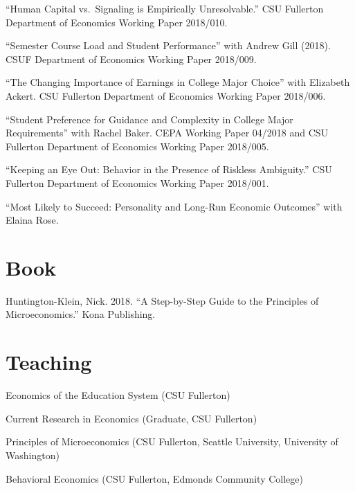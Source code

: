 \documentclass[11pt,a4paper,serif]{moderncv}
\begin{document}
 \begin{hangparas}{.25in}{1} 
 ``Human Capital vs.~Signaling is Empirically Unresolvable.'' CSU Fullerton Department of Economics Working Paper 2018/010.



``Semester Course Load and Student Performance'' with Andrew Gill (2018). CSUF Department of Economics Working Paper 2018/009.



``The Changing Importance of Earnings in College Major Choice'' with Elizabeth Ackert. CSU Fullerton Department of Economics Working Paper 2018/006.



``Student Preference for Guidance and Complexity in College Major Requirements'' with Rachel Baker. CEPA Working Paper 04/2018 and CSU Fullerton Department of Economics Working Paper 2018/005.



``Keeping an Eye Out: Behavior in the Presence of Riskless Ambiguity.'' CSU Fullerton Department of Economics Working Paper 2018/001.



``Most Likely to Succeed: Personality and Long-Run Economic Outcomes'' with Elaina Rose.

 
 \end{hangparas}


\section{Book}  
  
Huntington-Klein, Nick. 2018. ``A Step-by-Step Guide to the Principles of Microeconomics.'' Kona Publishing.



\section{Teaching}  
  
Economics of the Education System (CSU Fullerton)



Current Research in Economics (Graduate, CSU Fullerton)



Principles of Microeconomics (CSU Fullerton, Seattle University, University of Washington)



Behavioral Economics (CSU Fullerton, Edmonds Community College)
\end{document}
